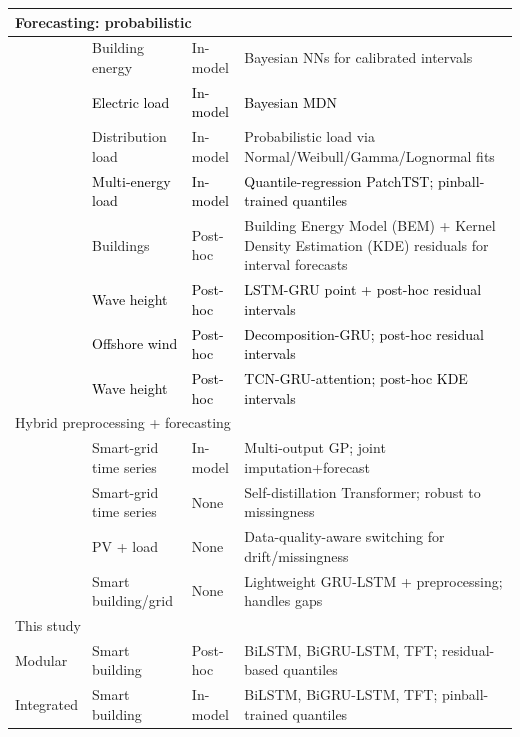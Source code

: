 \documentclass[final,10pt,1p,authoryear]{elsarticle}
\theoremstyle{definition}
\begin{document}
\begin{table}[!htbp]
{\begin{tabular}{lllp{9cm}}
\multicolumn{4}{l}{{Forecasting: probabilistic}}\\\hline
\citet{mahajan2024bayesian} & Building energy & In-model & Bayesian NNs for calibrated intervals \\
\textcolor{black}{\citet{brusaferri2022probabilistic}} & \textcolor{black}{Electric load} & \textcolor{black}{In-model} & \textcolor{black}{Bayesian MDN} \\
\citet{ozdemir2024probabilistic} & Distribution load & In-model & Probabilistic load via Normal/Weibull/Gamma/Lognormal fits \\
\textcolor{black}{\citet{ZHANG2025303}} & \textcolor{black}{Multi-energy load} & \textcolor{black}{In-model} & \textcolor{black}{Quantile-regression PatchTST; pinball-trained quantiles} \\
\citet{lucas2021probabilistic} & Buildings & Post-hoc & Building Energy Model (BEM) + Kernel Density Estimation (KDE) residuals for interval forecasts \\
\textcolor{black}{\citet{wangying2023wave}} & \textcolor{black}{Wave height} & \textcolor{black}{Post-hoc} & \textcolor{black}{LSTM-GRU point + post-hoc residual intervals} \\
\textcolor{black}{\citet{wang2024offshorewind}} & \textcolor{black}{Offshore wind} & \textcolor{black}{Post-hoc} & \textcolor{black}{Decomposition-GRU; post-hoc residual intervals} \\
\textcolor{black}{\citet{wang2025waveheight}} & \textcolor{black}{Wave height} & \textcolor{black}{Post-hoc} & \textcolor{black}{TCN-GRU-attention; post-hoc KDE intervals} \\
\hline

\multicolumn{4}{l}{{Hybrid preprocessing + forecasting}}\\\hline
\citet{Multioutput} & Smart-grid time series & In-model & Multi-output GP; joint imputation+forecast \\
\citet{MCSD_Transformer} & Smart-grid time series & None & Self-distillation Transformer; robust to missingness \\
\citet{sundararajan2022data} & PV + load & None & Data-quality-aware switching for drift/missingness \\
\citet{sarah2025lightweight} & Smart building/grid & None & Lightweight GRU-LSTM + preprocessing; handles gaps \\\hline

\multicolumn{4}{l}{{This study}}\\\hline
{Modular} & Smart building & Post-hoc & BiLSTM, BiGRU-LSTM, TFT; residual-based quantiles \\
{Integrated} & Smart building & In-model & BiLSTM, BiGRU-LSTM, TFT; pinball-trained quantiles \\\hline

\end{tabular}}
\end{table}
\end{document}
